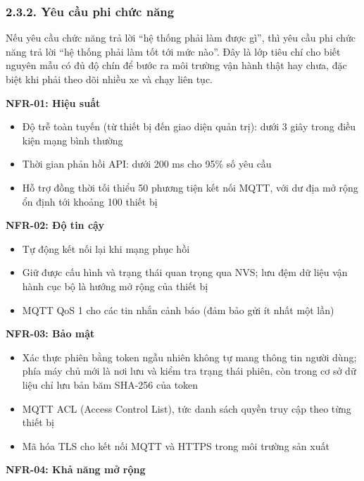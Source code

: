 \documentclass[a4paper]{extarticle}
\providecommand{\tightlist}{%
  \setlength{\itemsep}{0pt}\setlength{\parskip}{0pt}}
\begin{document}
\subsubsection{2.3.2. Yêu cầu phi chức
năng}\label{232-yuxeau-cux1ea7u-phi-chux1ee9c-nux103ng}

Nếu yêu cầu chức năng trả lời ``hệ thống phải làm được gì'', thì yêu cầu
phi chức năng trả lời ``hệ thống phải làm tốt tới mức nào''. Đây là lớp
tiêu chí cho biết nguyên mẫu có đủ độ chín để bước ra môi trường vận
hành thật hay chưa, đặc biệt khi phải theo dõi nhiều xe và chạy liên
tục.

\textbf{NFR-01: Hiệu suất}

\begin{itemize}
\tightlist
\item
  Độ trễ toàn tuyến (từ thiết bị đến giao diện quản trị): dưới 3 giây trong điều
  kiện mạng bình thường
\item
  Thời gian phản hồi API: dưới 200 ms cho 95\% số yêu cầu
\item
  Hỗ trợ đồng thời tối thiểu 50 phương tiện kết nối MQTT, với dư địa mở
  rộng ổn định tới khoảng 100 thiết bị
\end{itemize}

\textbf{NFR-02: Độ tin cậy}

\begin{itemize}
\tightlist
\item
  Tự động kết nối lại khi mạng phục hồi
\item
  Giữ được cấu hình và trạng thái quan trọng qua NVS; lưu đệm dữ liệu
  vận hành cục bộ là hướng mở rộng của thiết bị
\item
  MQTT QoS 1 cho các tin nhắn cảnh báo (đảm bảo gửi ít nhất một lần)
\end{itemize}

\textbf{NFR-03: Bảo mật}

\begin{itemize}
\tightlist
\item
  Xác thực phiên bằng token ngẫu nhiên không tự mang thông tin người
  dùng; phía máy chủ mới là nơi lưu và kiểm tra trạng thái phiên, còn
  trong cơ sở dữ liệu chỉ lưu bản băm SHA-256 của token
\item
  MQTT ACL (Access Control List), tức danh sách quyền truy cập theo từng
  thiết bị
\item
  Mã hóa TLS cho kết nối MQTT và HTTPS trong môi trường sản xuất
\end{itemize}

\textbf{NFR-04: Khả năng mở rộng}
\end{document}
